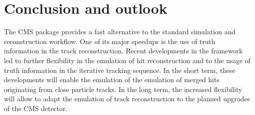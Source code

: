 

\section{Conclusion and outlook}

The CMS \FSIM package provides a fast alternative to the standard simulation and reconstruction workflow. One of its major speedups is the use of truth information in the track reconstruction. Recent developments in the framework led to further flexibility in the emulation of hit reconstruction and to the usage of truth information in the iterative tracking sequence. In the short term, these developments will enable the emulation of the emulation of merged hits originating from close particle tracks. In the long term, the increased flexibility will allow to adapt the emulation of track reconstruction to the planned upgrades of the CMS detector.

